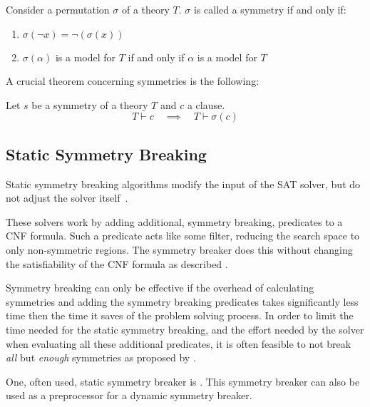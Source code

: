 

		Consider a permutation $\sigma$ of a theory $T$.
		$\sigma$ is called a symmetry if and only if:

		\begin{enumerate}
			\item $\sigma(\neg x) = \neg(\sigma( x ))$
			\item $\sigma(\alpha )$ is a model for $T$ if and only if $\alpha$ is a model for
				$T$
		\end{enumerate}

		A crucial theorem concerning symmetries is the following: \\

		\begin{proposition}
			\label{prop:symmetric_clause_learning}
			Let $s$ be a symmetry of a theory $T$ and $c$ a clause.
			\begin{equation}
				T \vdash c \quad \implies \quad T \vdash \sigma( c )
			\end{equation}
		\end{proposition}

\subsection{Static Symmetry Breaking}
	Static symmetry breaking algorithms modify the input of the SAT solver, but do not
	adjust the solver itself~\cite{sakallah2009symmetry}.

	These solvers work by adding additional, symmetry breaking, predicates to a CNF 
	formula. Such a predicate acts like some filter, reducing the search space to only 
	non-symmetric regions. The symmetry breaker does this without changing the 
	satisfiability of the CNF formula as described \cite{aloul2003shatter}.

	Symmetry breaking can only be effective if the overhead of calculating symmetries and
	adding the symmetry breaking predicates takes significantly less time then the time it
	saves of the problem solving process. In order to limit the time needed for the static
	symmetry breaking, and the effort needed by the solver when evaluating all these
	additional predicates, it is often feasible to not break \emph{all} but \emph{enough} 
	symmetries as proposed by \cite{aloul2003shatter}.
	
	One, often used, static symmetry breaker is \cite{aloul2003shatter}. This symmetry
	breaker can also be used as a preprocessor for a dynamic symmetry breaker.

